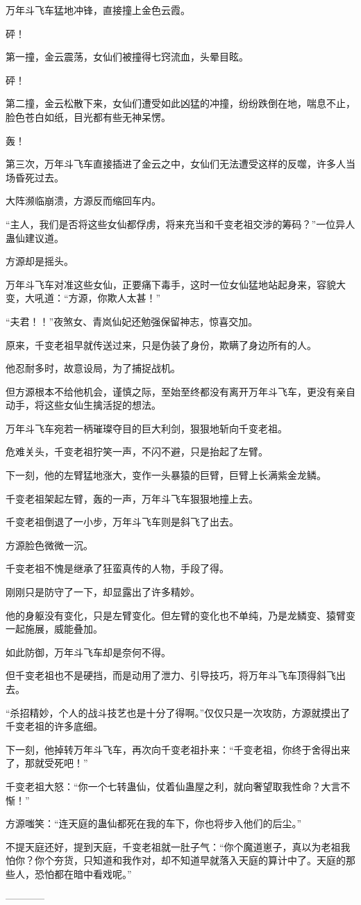 \begin{this_body}
万年斗飞车猛地冲锋，直接撞上金色云霞。

砰！

第一撞，金云震荡，女仙们被撞得七窍流血，头晕目眩。

砰！

第二撞，金云松散下来，女仙们遭受如此凶猛的冲撞，纷纷跌倒在地，喘息不止，脸色苍白如纸，目光都有些无神呆愣。

轰！

第三次，万年斗飞车直接插进了金云之中，女仙们无法遭受这样的反噬，许多人当场昏死过去。

大阵濒临崩溃，方源反而缩回车内。

“主人，我们是否将这些女仙都俘虏，将来充当和千变老祖交涉的筹码？”一位异人蛊仙建议道。

方源却是摇头。

万年斗飞车对准这些女仙，正要痛下毒手，这时一位女仙猛地站起身来，容貌大变，大吼道：“方源，你欺人太甚！”

“夫君！！”夜煞女、青岚仙妃还勉强保留神志，惊喜交加。

原来，千变老祖早就传送过来，只是伪装了身份，欺瞒了身边所有的人。

他忍耐多时，故意设局，为了捕捉战机。

但方源根本不给他机会，谨慎之际，至始至终都没有离开万年斗飞车，更没有亲自动手，将这些女仙生擒活捉的想法。

万年斗飞车宛若一柄璀璨夺目的巨大利剑，狠狠地斩向千变老祖。

危难关头，千变老祖狞笑一声，不闪不避，只是抬起了左臂。

下一刻，他的左臂猛地涨大，变作一头暴猿的巨臂，巨臂上长满紫金龙鳞。

千变老祖架起左臂，轰的一声，万年斗飞车狠狠地撞上去。

千变老祖倒退了一小步，万年斗飞车则是斜飞了出去。

方源脸色微微一沉。

千变老祖不愧是继承了狂蛮真传的人物，手段了得。

刚刚只是防守了一下，却显露出了许多精妙。

他的身躯没有变化，只是左臂变化。但左臂的变化也不单纯，乃是龙鳞变、猿臂变一起施展，威能叠加。

如此防御，万年斗飞车却是奈何不得。

但千变老祖也不是硬挡，而是动用了泄力、引导技巧，将万年斗飞车顶得斜飞出去。

“杀招精妙，个人的战斗技艺也是十分了得啊。”仅仅只是一次攻防，方源就摸出了千变老祖的许多底细。

下一刻，他掉转万年斗飞车，再次向千变老祖扑来：“千变老祖，你终于舍得出来了，那就受死吧！”

千变老祖大怒：“你一个七转蛊仙，仗着仙蛊屋之利，就向奢望取我性命？大言不惭！”

方源嗤笑：“连天庭的蛊仙都死在我的车下，你也将步入他们的后尘。”

不提天庭还好，提到天庭，千变老祖就一肚子气：“你个魔道崽子，真以为老祖我怕你？你个夯货，只知道和我作对，却不知道早就落入天庭的算计中了。天庭的那些人，恐怕都在暗中看戏呢。”

------------

\end{this_body}

